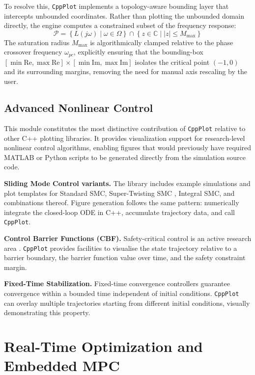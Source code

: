 \documentclass[preprint,12pt]{elsarticle}
\begin{document}
To resolve this, \texttt{CppPlot} implements a topology-aware bounding layer that intercepts unbounded coordinates. Rather than plotting the unbounded domain directly, the engine computes a constrained subset of the frequency response:
\begin{equation}
    \mathcal{P} = \left\{ L(j\omega) \mid \omega \in \Omega \right\} \cap \left\{ z \in \mathbb{C} \mid |z| \le M_{\max} \right\}
\end{equation}
The saturation radius $M_{\max}$ is algorithmically clamped relative to the phase crossover frequency $\omega_{pc}$, explicitly ensuring that the bounding-box $[\min \mathrm{Re}, \max \mathrm{Re}] \times [\min \mathrm{Im}, \max \mathrm{Im}]$ isolates the critical point $(-1, 0)$ and its surrounding margins, removing the need for manual axis rescaling by the user.

\subsection{Advanced Nonlinear Control}
This module constitutes the most distinctive contribution of \texttt{CppPlot} relative to other C++ plotting libraries. It provides visualization support for research-level nonlinear control algorithms, enabling figures that would previously have required MATLAB or Python scripts to be generated directly from the simulation source code.

\textbf{Sliding Mode Control variants.} The library includes example simulations and plot templates for Standard SMC, Super-Twisting SMC \cite{Levant1993}, Integral SMC, and combinations thereof. Figure generation follows the same pattern: numerically integrate the closed-loop ODE in C++, accumulate trajectory data, and call \texttt{CppPlot}.

\textbf{Control Barrier Functions (CBF).} Safety-critical control is an active research area \cite{Ames2019}. \texttt{CppPlot} provides facilities to visualise the state trajectory relative to a barrier boundary, the barrier function value over time, and the safety constraint margin.

\textbf{Fixed-Time Stabilization.} Fixed-time convergence controllers \cite{Polyakov2012} guarantee convergence within a bounded time independent of initial conditions. \texttt{CppPlot} can overlay multiple trajectories starting from different initial conditions, visually demonstrating this property.

\section{Real-Time Optimization and Embedded MPC}
\label{sec:mpc}
\end{document}
